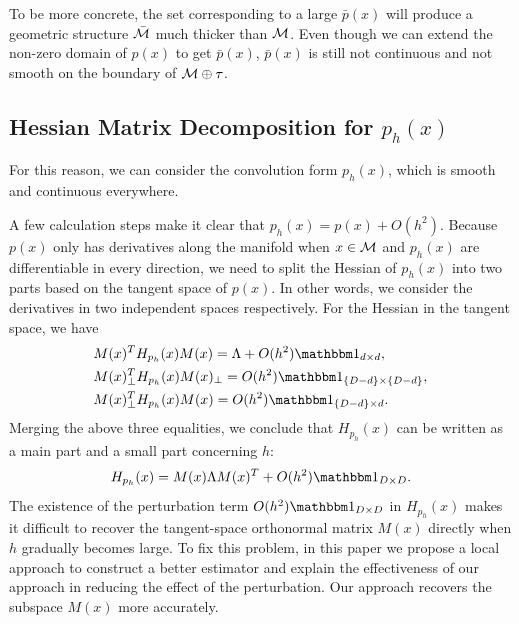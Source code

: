 \documentclass[aos,preprint]{imsart}
\theoremstyle{remark}
\begin{document}
To be more concrete, the set corresponding to a large $\bar{p}(x)$ will produce a geometric structure $\bar{\cal M}$ much thicker than $\cal M$. Even though we can extend the non-zero domain of $p(x)$ to get $\bar{p}(x)$, $\bar{p}(x)$ is still not continuous and not smooth on the boundary of $\cal M\oplus \tau$.

\subsection{Hessian Matrix Decomposition for $p_h(x)$}
For this reason, we can consider the convolution form $p_h(x)$, which is smooth and continuous everywhere.

A few calculation steps make it clear that $p_h(x) = p(x)+O(h^2)$.
Because $p(x)$ only has derivatives along the manifold when $x\in \cal M$ and $p_h(x)$ are differentiable in every direction, we need to split the Hessian of $p_h(x)$ into two parts based on the tangent space of $p(x)$. In other words, we consider the derivatives in two independent spaces respectively. For the Hessian in the tangent space, we have
\[
\begin{aligned}
 &M(x)^T H_{p_h}(x) M(x) =  \Lambda + O(h^2) \mathbbm 1_{d\times d},\\
 &M(x)_\perp^T H_{p_h}(x) M(x)_\perp  =  O(h^2) {\mathbbm 1}_{\{D-d\}\times \{D-d\}},\\
 &M(x)_\perp^T H_{p_h}(x) M(x) = O(h^2) {\mathbbm 1}_{\{D-d\}\times d}.
\end{aligned}
\]
Merging the above three equalities, we conclude that $H_{p_h}(x)$ can be written as a main part and a small part concerning $h$:
\[
H_{p_h}(x) = M(x) \Lambda M(x)^T + O(h^2){\mathbbm 1}_{D\times D}.
\]
The existence of the perturbation term $O(h^2){\mathbbm 1}_{D\times D}$ in $H_{p_h}(x)$ makes it difficult to recover the tangent-space orthonormal matrix $M(x)$ directly when $h$ gradually becomes large. To fix this problem, in this paper we propose a local approach to construct a better estimator and explain the effectiveness of our approach in reducing the effect of the perturbation. Our approach recovers the subspace $M(x)$ more accurately.
\end{document}

